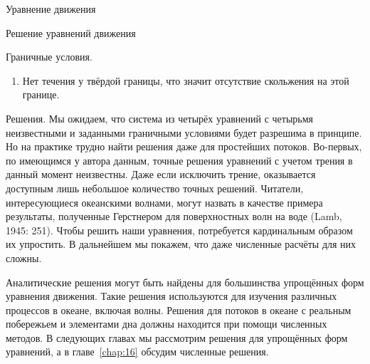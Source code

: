 \begin{chapter}{Уравнение движения}
\begin{section}{Решение уравнений движения}
\begin{paragraph}{Граничные условия.}
\begin{enumerate}
\item
Нет течения у твёрдой границы, что значит
отсутствие скольжения на этой границе.
%
\end{enumerate}
\end{paragraph}

\begin{paragraph}{Решения.}
Мы ожидаем, что система из четырёх уравнений с четырьмя неизвестными и 
заданными граничными условиями будет разрешима в принципе. Но на практике 
трудно найти решения даже для простейших потоков. Во-первых, по имеющимся
у автора данным, точные решения уравнений с учетом трения в данный момент
неизвестны. Даже если исключить трение, оказывается доступным лишь небольшое 
количество точных решений. Читатели, интересующиеся океанскими волнами, могут
назвать в качестве примера результаты, полученные Герстнером для поверхностных
волн на воде (Lamb, 1945: 251). Чтобы решить наши уравнения, потребуется
кардинальным образом их упростить. В дальнейшем мы покажем, что даже
численные расчёты для них сложны.
%

Аналитические решения могут быть найдены для большинства упрощённых
форм уравнения движения. Такие решения используются для изучения
различных процессов в океане, включая волны. Решения для потоков в
океане с реальным побережьем и элементами дна должны находится при
помощи численных методов. В следующих главах мы рассмотрим решения для 
упрощённых форм уравнений, а в главе~\ref{chap:16} обсудим численные
решения.
%
\end{paragraph}
\end{section}


\end{chapter}

